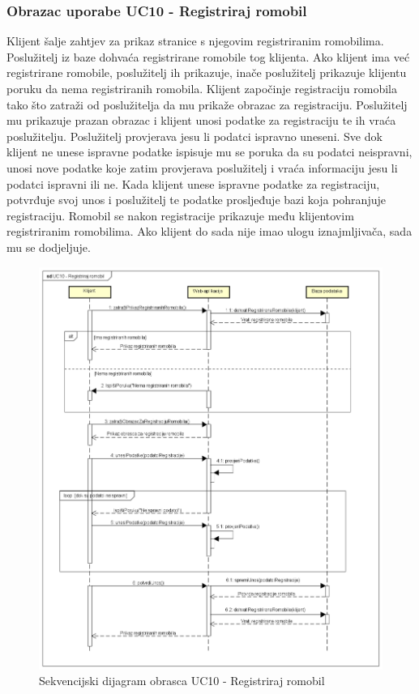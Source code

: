 				\subsubsection{Obrazac uporabe UC10 - Registriraj romobil}
						Klijent šalje zahtjev za prikaz stranice s njegovim registriranim romobilima. Poslužitelj iz baze dohvaća registrirane romobile tog klijenta. Ako klijent ima već registrirane romobile, poslužitelj ih prikazuje, inače poslužitelj prikazuje klijentu poruku da nema registriranih romobila. Klijent započinje registraciju romobila tako što zatraži od poslužitelja da mu prikaže obrazac za registraciju. Poslužitelj mu prikazuje prazan obrazac i klijent unosi podatke za registraciju te ih vraća poslužitelju. Poslužitelj provjerava jesu li podatci ispravno uneseni. Sve dok klijent ne unese ispravne podatke ispisuje mu se poruka da su podatci neispravni, unosi nove podatke koje zatim provjerava poslužitelj i vraća informaciju jesu li podatci ispravni ili ne. Kada klijent unese ispravne podatke za registraciju, potvrđuje svoj unos i poslužitelj te podatke prosljeđuje bazi koja pohranjuje registraciju. Romobil se nakon registracije prikazuje među klijentovim registriranim romobilima. Ako klijent do sada nije imao ulogu iznajmljivača, sada mu se dodjeljuje. 
						
						\begin{figure} [H]
							
							\includegraphics[width=1\linewidth]{dijagrami/UC10 - Registriraj romobil.png}
							\centering
							\caption{Sekvencijski dijagram obrasca UC10 - Registriraj romobil}
							\label{fig:Sekvencijski dijagram obrasca UC10 - Registriraj romobil}
						\end{figure}
				
